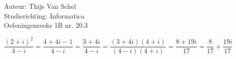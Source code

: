 \documentclass[a4paper]{article}
\begin{document}
  
\noindent \large Auteur: Thijs Van Schel \\
\noindent \large Studierichting: Informatica\\
\noindent \large Oefeningenreeks 1B nr. 20.3\\

\medskip

\normalsize

$\dfrac{(2+i)^2}{4-i} = \dfrac{4+4i-1}{4-i} = \dfrac{3+4i}{4-i} = \dfrac{(3+4i)(4+i)}{(4-i)(4+i)} = \dfrac{8+19i}{17} = \dfrac{8}{17} + \dfrac{19i}{17}$

\begin{thebibliography}{999}
\end{thebibliography}
\end{document}

